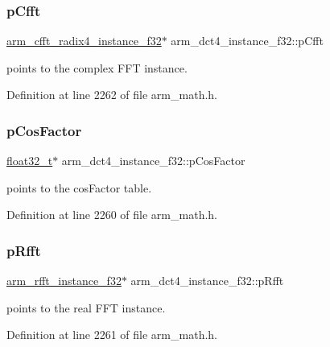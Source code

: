\subsubsection{\texorpdfstring{p\+Cfft}{pCfft}}
{\footnotesize\ttfamily \hyperlink{structarm__cfft__radix4__instance__f32}{arm\+\_\+cfft\+\_\+radix4\+\_\+instance\+\_\+f32}$\ast$ arm\+\_\+dct4\+\_\+instance\+\_\+f32\+::p\+Cfft}

points to the complex F\+FT instance. 

Definition at line 2262 of file arm\+\_\+math.\+h.

\mbox{\label{structarm__dct4__instance__f32_a6da1187e070801e011ce5e0582efa861}} 
\subsubsection{\texorpdfstring{p\+Cos\+Factor}{pCosFactor}}
{\footnotesize\ttfamily \hyperlink{arm__math_8h_a4611b605e45ab401f02cab15c5e38715}{float32\+\_\+t}$\ast$ arm\+\_\+dct4\+\_\+instance\+\_\+f32\+::p\+Cos\+Factor}

points to the cos\+Factor table. 

Definition at line 2260 of file arm\+\_\+math.\+h.

\mbox{\label{structarm__dct4__instance__f32_a978f37fc19add31af243ab5c63ae502f}} 
\subsubsection{\texorpdfstring{p\+Rfft}{pRfft}}
{\footnotesize\ttfamily \hyperlink{structarm__rfft__instance__f32}{arm\+\_\+rfft\+\_\+instance\+\_\+f32}$\ast$ arm\+\_\+dct4\+\_\+instance\+\_\+f32\+::p\+Rfft}

points to the real F\+FT instance. 

Definition at line 2261 of file arm\+\_\+math.\+h.

\mbox{\label{structarm__dct4__instance__f32_ad13544aafad268588c62e3eb35ae662c}} 
